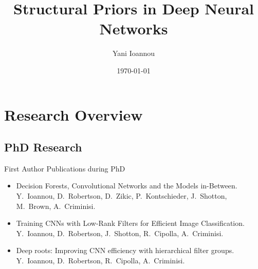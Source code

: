 \documentclass[t,xcolor=dvipsnames]{beamer}
\title[Structural Priors in Deep Neural Networks] %
{Structural Priors in Deep Neural Networks}
\author[Yani Ioannou]
{Yani Ioannou}
\institute[University of Cambridge] %
{University of Cambridge}
\date{\today}
\begin{document}


\begin{frame}
  \titlepage
\end{frame}






\section{Research Overview}

\subsection{PhD Research}

\begin{frame}{First Author Publications during PhD}
\begin{itemize}
    \item Decision Forests, Convolutional Networks and the Models in-Between.\\{\footnotesize Y.\ Ioannou, D.\ Robertson, D.\ Zikic, P.\ Kontschieder, J.\ Shotton, M.\ Brown, A.\ Criminisi.}%
    \item Training CNNs with Low-Rank Filters for Efficient Image Classification.\\{\footnotesize Y.\ Ioannou, D.\ Robertson, J.\ Shotton, R.\ Cipolla, A.\ Criminisi.}%
    \item Deep roots: Improving CNN efficiency with hierarchical filter groups.\\{\footnotesize Y.\ Ioannou, D.\ Robertson, R.\ Cipolla, A.\ Criminisi.}%
    
\end{itemize}
\end{frame}
\end{document}
